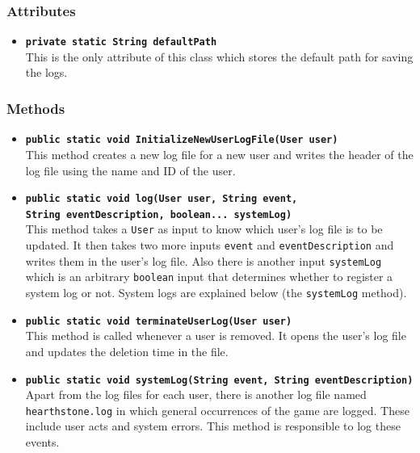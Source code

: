 \documentclass[a4paper]{article}
\begin{document}
\subsubsection{Attributes}
\begin{itemize}
	\item \texttt{\textbf{private static String defaultPath}}\\
	This is the only attribute of this class which stores the default path for saving the logs.
\end{itemize}

\subsubsection{Methods}
\begin{itemize}
	\item \texttt{\textbf{public static void InitializeNewUserLogFile(User user)}}\\
	This method creates a new log file for a new user and writes the header of the log file using the name and ID of the user.
	
	\item \texttt{\textbf{public static void log(User user, String event,\\ String eventDescription, boolean... systemLog)}}\\
	This method takes a \texttt{User} as input to know which user's log file is to be updated. It then takes two more inputs \texttt{event} and \texttt{eventDescription} and writes them in the user's log file. Also there is another input \texttt{systemLog} which is an arbitrary \texttt{boolean} input that determines whether to register a system log or not. System logs are explained below (the \texttt{systemLog} method).
	
	\item \texttt{\textbf{public static void terminateUserLog(User user)}}\\
	This method is called whenever a user is removed. It opens the user's log file and updates the deletion time in the file.
	
	\item \texttt{\textbf{public static void systemLog(String event, String eventDescription)}}\\	
	Apart from the log files for each user, there is another log file named \texttt{hearthstone.log} in which general occurrences of the game are logged. These include user acts and system errors. This method is responsible to log these events.
\end{itemize}
\end{document}
